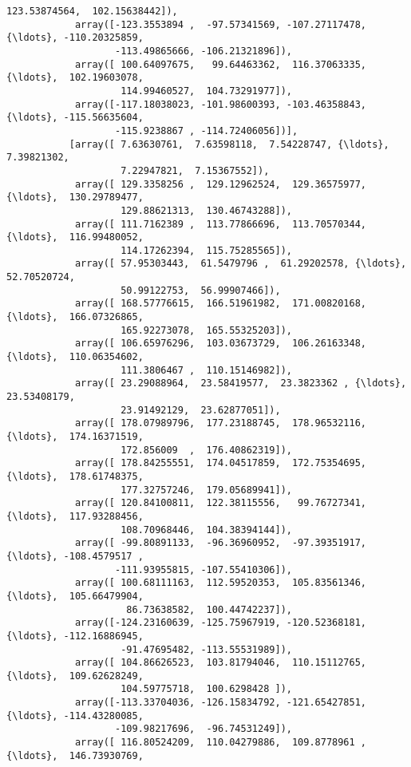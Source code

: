 \documentclass[11pt]{article}
\begin{document}
\begin{Verbatim}[commandchars=\\\{\}]
                    123.53874564,  102.15638442]),
            array([-123.3553894 ,  -97.57341569, -107.27117478, {\ldots}, -110.20325859,
                   -113.49865666, -106.21321896]),
            array([ 100.64097675,   99.64463362,  116.37063335, {\ldots},  102.19603078,
                    114.99460527,  104.73291977]),
            array([-117.18038023, -101.98600393, -103.46358843, {\ldots}, -115.56635604,
                   -115.9238867 , -114.72406056])],
           [array([ 7.63630761,  7.63598118,  7.54228747, {\ldots},  7.39821302,
                    7.22947821,  7.15367552]),
            array([ 129.3358256 ,  129.12962524,  129.36575977, {\ldots},  130.29789477,
                    129.88621313,  130.46743288]),
            array([ 111.7162389 ,  113.77866696,  113.70570344, {\ldots},  116.99480052,
                    114.17262394,  115.75285565]),
            array([ 57.95303443,  61.5479796 ,  61.29202578, {\ldots},  52.70520724,
                    50.99122753,  56.99907466]),
            array([ 168.57776615,  166.51961982,  171.00820168, {\ldots},  166.07326865,
                    165.92273078,  165.55325203]),
            array([ 106.65976296,  103.03673729,  106.26163348, {\ldots},  110.06354602,
                    111.3806467 ,  110.15146982]),
            array([ 23.29088964,  23.58419577,  23.3823362 , {\ldots},  23.53408179,
                    23.91492129,  23.62877051]),
            array([ 178.07989796,  177.23188745,  178.96532116, {\ldots},  174.16371519,
                    172.856009  ,  176.40862319]),
            array([ 178.84255551,  174.04517859,  172.75354695, {\ldots},  178.61748375,
                    177.32757246,  179.05689941]),
            array([ 120.84100811,  122.38115556,   99.76727341, {\ldots},  117.93288456,
                    108.70968446,  104.38394144]),
            array([ -99.80891133,  -96.36960952,  -97.39351917, {\ldots}, -108.4579517 ,
                   -111.93955815, -107.55410306]),
            array([ 100.68111163,  112.59520353,  105.83561346, {\ldots},  105.66479904,
                     86.73638582,  100.44742237]),
            array([-124.23160639, -125.75967919, -120.52368181, {\ldots}, -112.16886945,
                    -91.47695482, -113.55531989]),
            array([ 104.86626523,  103.81794046,  110.15112765, {\ldots},  109.62628249,
                    104.59775718,  100.6298428 ]),
            array([-113.33704036, -126.15834792, -121.65427851, {\ldots}, -114.43280085,
                   -109.98217696,  -96.74531249]),
            array([ 116.80524209,  110.04279886,  109.8778961 , {\ldots},  146.73930769,

\end{Verbatim}
\end{document}
